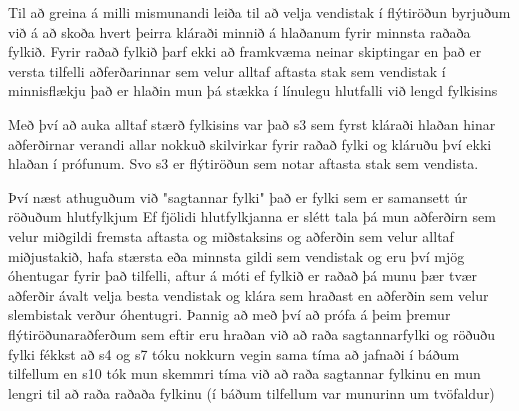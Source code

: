 Til að greina á milli mismunandi leiða til að velja vendistak í flýtiröðun byrjuðum við á að skoða hvert þeirra kláraði minnið á hlaðanum fyrir minnsta raðaða fylkið.
Fyrir raðað fylkið þarf ekki að framkvæma neinar skiptingar en það er versta tilfelli aðferðarinnar sem velur alltaf aftasta stak sem vendistak í minnisflækju það er hlaðin mun þá stækka í línulegu hlutfalli við lengd fylkisins 

Með því að auka alltaf stærð fylkisins var það s3 sem fyrst kláraði hlaðan hinar aðferðirnar verandi allar nokkuð skilvirkar  fyrir raðað fylki og kláruðu því ekki hlaðan í prófunum. Svo s3 er flýtiröðun sem notar aftasta stak sem vendista.

Því næst athuguðum við "sagtannar fylki" það er fylki sem er samansett úr röðuðum hlutfylkjum
Ef fjölidi hlutfylkjanna er slétt tala þá mun aðferðirn sem velur miðgildi fremsta aftasta og miðstaksins og aðferðin sem velur  alltaf miðjustakið, hafa stærsta eða minnsta gildi sem vendistak og eru því mjög óhentugar fyrir það tilfelli, aftur á móti ef fylkið er raðað þá munu þær tvær aðferðir ávalt velja besta vendistak og klára sem hraðast en aðferðin sem velur slembistak verður óhentugri.
Þannig að með því að prófa á þeim þremur flýtiröðunaraðferðum sem eftir eru hraðan við að raða sagtannarfylki og röðuðu fylki fékkst að s4 og s7 tóku nokkurn vegin sama tíma að jafnaði í báðum tilfellum en s10 tók mun skemmri tíma við að raða sagtannar fylkinu en mun lengri til að raða raðaða  fylkinu (í báðum tilfellum var munurinn um tvöfaldur)
